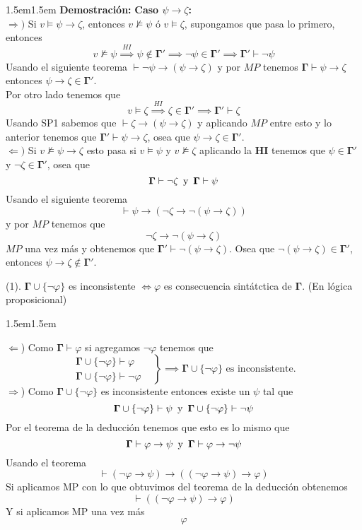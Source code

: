 \documentclass[leqno, 12pt, twoside,letterpaper]{book}
\theoremstyle{plain}
\theoremstyle{definition}
\newcommand{\pset}[1]{\{ #1 \}}
\newcommand{\bgamma}[0]{\bm{\Gamma}}
\newcommand{\sii}[0]{\Longleftrightarrow}
\newcommand{\union}[0]{\cup}
\newcommand{\piz}[0]{\psi \rightarrow \zeta}
\newcounter{excounter}
\newenvironment{solucion}[0]{\begin{adjustwidth}{1.5em}{1.5em}}{\end{adjustwidth}}
\newenvironment{dem}[0]{\noindent\textbf{Demostración:}}{}
\newenvironment{ej}[1]{\noindent\stepcounter{excounter} \begin{exbox}\textbf{\arabic{excounter}} (#1).}{\end{exbox}}
\newcommand{\grab}[3]
{
	\left.
		\begin{array}{ll}
			#1 & \\
			#2
		\end{array}
	\right\} \implies #3
}
\begin{document}
\begin{solucion}
\begin{dem}
\noindent \textbf{Caso $\piz$:} \\ 
\noindent $\Rightarrow)$ Si $v \models \piz$, entonces $v \not\models \psi$ ó $v \models \zeta$, supongamos que pasa lo primero, entonces 
\[v \not\models \psi \overset{HI}{\implies} \psi \not\in\bgamma' \implies \lnot\psi \in \bgamma' \implies \bgamma' \vdash \lnot\psi \]
Usando el siguiente teorema $\vdash \lnot\psi \rightarrow (\piz)$ y por $MP$ tenemos $\bgamma \vdash \piz$ entonces $\piz \in \bgamma'$. \\
Por otro lado tenemos que 
	\[ v \models \zeta \overset{HI}{\implies} \zeta \in \bgamma' \implies \bgamma' \vdash \zeta \]
Usando SP1 sabemos que $\vdash \zeta \rightarrow (\piz)$ y aplicando $MP$ entre esto y lo anterior tenemos que $\bgamma' \vdash \piz$, osea que $\piz \in \bgamma'$.\\

\noindent $\Leftarrow)$ Si $v \not\models \piz$ esto pasa si $v \models \psi$ y $v \not\models \zeta$ aplicando la \textbf{HI} tenemos que $\psi \in \bgamma'$ y $\lnot\zeta \in \bgamma'$, osea que 
\[\bgamma \vdash \lnot\zeta \mbox{\, y \,} \bgamma \vdash \psi\] 
Usando el siguiente teorema 
\[ \vdash \psi \rightarrow (\lnot \zeta \rightarrow \lnot(\piz))\]
y por $MP$ tenemos que
\[ \lnot\zeta \rightarrow \lnot(\piz)\]
$MP$ una vez más y obtenemos que $\bgamma' \vdash \lnot(\piz)$. Osea que $\lnot(\piz) \in \bgamma'$, entonces $\piz \not\in \bgamma'$.
\end{dem}
\end{solucion}

\begin{ej}{1}
    $\bgamma \union \{ \lnot\varphi \}$ es inconsistente $\sii \varphi$ es
    consecuencia sintátctica de $\bgamma$. (En lógica proposicional) 
\end{ej}

\begin{solucion}

$\Leftarrow$) Como $\bgamma \vdash \varphi$ si agregamos $\lnot\varphi$ tenemos que
	 \[\grab{\bgamma \cup \pset{\lnot\varphi} \vdash \varphi}
	 	    {\bgamma \cup \pset{\lnot\varphi} \vdash \lnot\varphi}
	 	    {\bgamma\cup\pset{\lnot\varphi} \mbox{ es inconsistente.}}\]
$\Rightarrow$) Como $\bgamma \cup \pset{\lnot\varphi}$ es inconsistente entonces existe un $\psi$ tal que
\[ \bgamma \cup \pset{\lnot\varphi} \vdash \psi \mbox{\, y \,} \bgamma \cup \pset{\lnot\varphi} \vdash \lnot \psi \]
Por el teorema de la deducción tenemos que esto es lo mismo que
\[ \bgamma \vdash \varphi \rightarrow \psi \mbox{\, y \,} \bgamma \vdash \varphi \rightarrow \lnot \psi \]
Usando el teorema 
\[ \vdash (\lnot\varphi \rightarrow \psi) \rightarrow ((\lnot\varphi \rightarrow \psi) \rightarrow \varphi) \]
Si aplicamos MP con lo que obtuvimos del teorema de la deducción obtenemos
\[ \vdash ((\lnot\varphi \rightarrow \psi) \rightarrow \varphi) \]
Y si aplicamos MP una vez más
\[ \varphi \]


\end{solucion}
\end{document}

